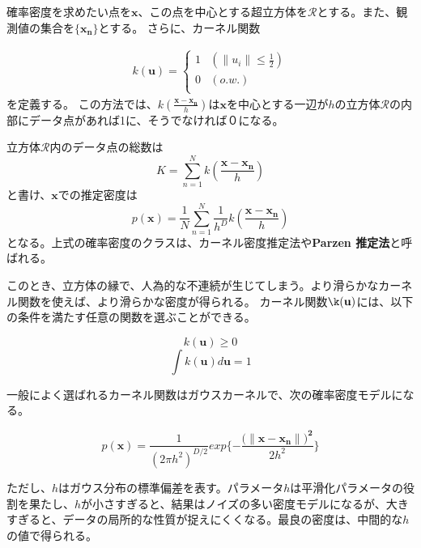 \documentclass[11pt,a4paper]{jsarticle}
\begin{document}
確率密度を求めたい点を$\mathbf{x}$、この点を中心とする超立方体を$\mathcal{R}$とする。また、観測値の集合を$\{\mathbf{\mathbf{x}_n}\}$とする。
さらに、カーネル関数

  \begin{eqnarray}
    k(\mathbf{u})=\left\{  \begin{array}{ll}
    1 & (\|u_i\| \leq \frac{1}{2}) \\
    0 & (o.w.) \\
    \end{array} \right.
  \end{eqnarray}
を定義する。
この方法では、$k(\frac{\mathbf{x} - \mathbf{x_n}}{h})$は$\mathbf{\mathbf{x}}$を中心とする一辺が$h$の立方体$\mathcal{R}$の内部にデータ点があれば1に、そうでなければ０になる。

立方体$\mathcal{R}$内のデータ点の総数は
\begin{equation}
  K = \sum_{n=1}^{N} k(\frac{\mathbf{x} - \mathbf{x_n}}{h})
\end{equation}
と書け、$\mathbf{\mathbf{x}}$での推定密度は
\begin{equation}
  p(\mathbf{x}) = \frac{1}{N}\sum_{n=1}^{N} \frac{1}{h^D} k(\frac{\mathbf{x} - \mathbf{x_n}}{h})
\end{equation}
となる。上式の確率密度のクラスは、カーネル密度推定法や\textbf{Parzen 推定法}と呼ばれる。

このとき、立方体の縁で、人為的な不連続が生じてしまう。より滑らかなカーネル関数を使えば、より滑らかな密度が得られる。
カーネル関数$\k(\mathbf{u})$には、以下の条件を満たす任意の関数を選ぶことができる。

\begin{equation}
  k(\mathbf{u}) \geq 0
\end{equation}
\begin{equation}
  \int k(\mathbf{u}) d\mathbf{u} = 1
\end{equation}

一般によく選ばれるカーネル関数はガウスカーネルで、次の確率密度モデルになる。

\begin{equation}
  p(\mathbf{x}) = \frac{1}{(2\pi h^2)^{D/2}} exp\{-\frac{(\|\mathbf{\mathbf{x}} - \mathbf{x_n\|)^2}}{2h^2}\}
\end{equation}

ただし、$h$はガウス分布の標準偏差を表す。パラメータ$h$は平滑化パラメータの役割を果たし、$h$が小さすぎると、結果はノイズの多い密度モデルになるが、大きすぎると、データの局所的な性質が捉えにくくなる。最良の密度は、中間的な$h$の値で得られる。
\end{document}
